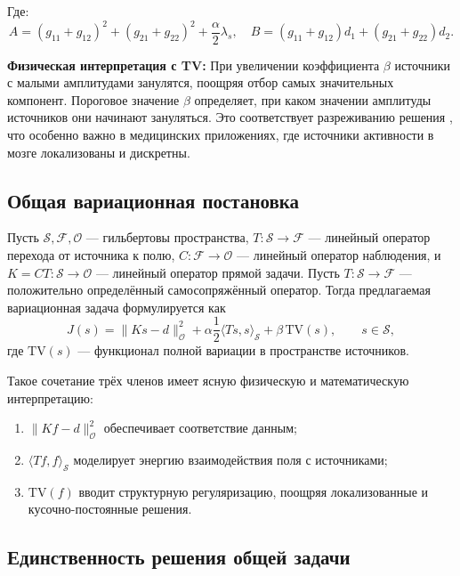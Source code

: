 \documentclass[sn-mathphys-num]{bst/sn-jnl}
\theoremstyle{thmstylethree}
\theoremstyle{thmstyletwo}
\theoremstyle{thmstyleone}
\begin{document}
Где:
\begin{equation}
    A = (g_{11}+g_{12})^2 + (g_{21}+g_{22})^2 + \frac{\alpha}{2} \lambda_s, \quad B = (g_{11}+g_{12})d_1 + (g_{21}+g_{22})d_2.
\end{equation}

\textbf{Физическая интерпретация с TV:} При увеличении коэффициента $\beta$ источники с малыми амплитудами 
занулятся, поощряя отбор самых значительных компонент. Пороговое значение $\beta$ определяет, 
при каком значении амплитуды источников они начинают зануляться.
Это соответствует разреживанию решения , что особенно важно в медицинских приложениях,
где источники активности в мозге локализованы и дискретны.

\subsection{Общая вариационная постановка}

Пусть $\mathcal{S},\mathcal{F},\mathcal{O}$ — гильбертовы пространства, $T:\mathcal{S}\to\mathcal{F}$ — 
линейный оператор перехода от источника к полю, $C:\mathcal{F}\to\mathcal{O}$ — линейный оператор 
наблюдения, и $K=C T:\mathcal{S}\to\mathcal{O}$ — линейный оператор прямой задачи. Пусть 
$T:\mathcal{S}\to\mathcal{F}$ — положительно определённый самосопряжённый оператор. Тогда предлагаемая вариационная задача формулируется как
\begin{equation}\label{eq:general_functional}
    J(s)=\|K s - d\|_{\mathcal{O}}^2 + \alpha \frac12 \langle T s, s\rangle_{\mathcal{S}} + \beta \,\mathrm{TV}(s),
    \qquad s\in \mathcal{S},
\end{equation}
где $\mathrm{TV}(s)$ — функционал полной вариации в пространстве источников.

Такое сочетание трёх членов имеет ясную физическую и математическую интерпретацию:
\begin{enumerate}
    \item $\|K f - d\|_{\mathcal{O}}^2$ обеспечивает соответствие данным;
    \item $\langle T f, f\rangle_{\mathcal{S}}$ моделирует энергию взаимодействия поля с источниками;
    \item $\mathrm{TV}(f)$ вводит структурную регуляризацию, поощряя локализованные и кусочно-постоянные 
    решения.
\end{enumerate}

\subsection{Единственность решения общей задачи}
\end{document}
